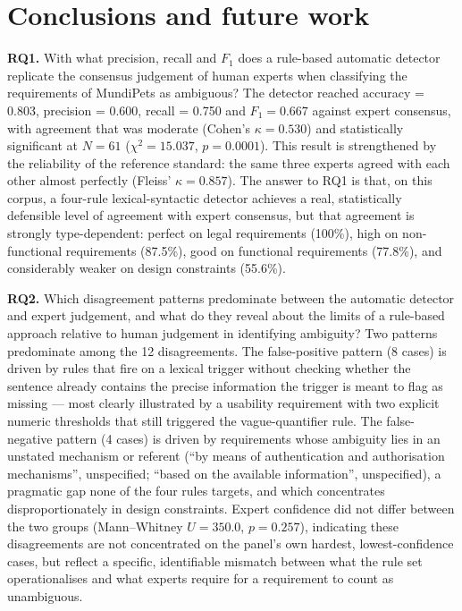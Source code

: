 \documentclass[pdflatex,sn-mathphys-num]{sn-jnl}
\theoremstyle{thmstyleone}%
\theoremstyle{thmstyletwo}%
\theoremstyle{thmstylethree}%
\begin{document}
	
	\section{Conclusions and future work}\label{sec:conclusions}
	
	\textbf{RQ1.} With what precision, recall and $F_1$ does a rule-based automatic
	detector replicate the consensus judgement of human experts when classifying
	the requirements of MundiPets as ambiguous? The detector reached accuracy =
	0.803, precision = 0.600, recall = 0.750 and $F_1 = 0.667$ against expert
	consensus, with agreement that was moderate (Cohen's $\kappa=0.530$) and
	statistically significant at $N=61$ ($\chi^2=15.037$, $p=0.0001$). This
	result is strengthened by the reliability of the reference standard: the same
	three experts agreed with each other almost perfectly (Fleiss' $\kappa=0.857$).
	The answer to RQ1 is that, on this corpus, a four-rule lexical-syntactic
	detector achieves a real, statistically defensible level of agreement with
	expert consensus, but that agreement is strongly type-dependent: perfect on
	legal requirements (100\%), high on non-functional requirements (87.5\%), good
	on functional requirements (77.8\%), and considerably weaker on design
	constraints (55.6\%).
	
	\textbf{RQ2.} Which disagreement patterns predominate between the automatic
	detector and expert judgement, and what do they reveal about the limits of a
	rule-based approach relative to human judgement in identifying ambiguity? Two
	patterns predominate among the 12 disagreements. The false-positive pattern (8
	cases) is driven by rules that fire on a lexical trigger without checking
	whether the sentence already contains the precise information the trigger is
	meant to flag as missing --- most clearly illustrated by a usability
	requirement with two explicit numeric thresholds that still triggered the
	vague-quantifier rule. The false-negative pattern (4 cases) is driven by
	requirements whose ambiguity lies in an unstated mechanism or referent (``by
	means of authentication and authorisation mechanisms'', unspecified;
	``based on the available information'', unspecified), a pragmatic gap none of
	the four rules targets, and which concentrates disproportionately in design
	constraints. Expert confidence did not differ between the two groups
	(Mann--Whitney $U=350.0$, $p=0.257$), indicating these disagreements are not
	concentrated on the panel's own hardest, lowest-confidence cases, but reflect a
	specific, identifiable mismatch between what the rule set operationalises and
	what experts require for a requirement to count as unambiguous.
	
\end{document}
